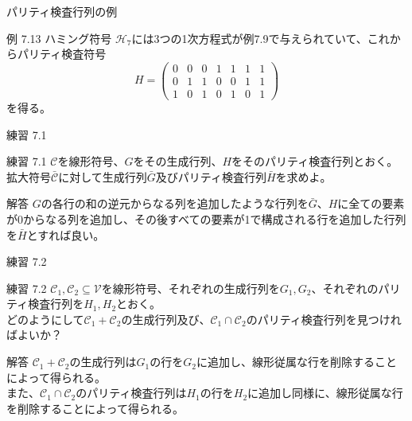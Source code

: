 \documentclass[dvipdfmx,10pt,jsarticle]{beamer}
\begin{document}
  \begin{frame}{パリティ検査行列の例}
    \begin{block}{例 7.13 ハミング符号}
      $\mathcal{H}_7$には3つの1次方程式が例7.9で与えられていて、これからパリティ検査符号
      \[H= \begin{pmatrix}
          0 & 0 & 0 & 1 & 1 & 1 & 1 \\
          0 & 1 & 1 & 0 & 0 & 1 & 1 \\
          1 & 0 & 1 & 0 & 1 & 0 & 1 
        \end{pmatrix} \]
      を得る。
    \end{block}
  \end{frame}
  \begin{frame}{練習 7.1}
    \begin{block}{練習 7.1}
      $\mathcal{C}$を線形符号、$G$をその生成行列、$H$をそのパリティ検査行列とおく。拡大符号$\bar{\mathcal{C}}$に対して生成行列$\bar G$及びパリティ検査行列$\bar H$を求めよ。
    \end{block}
    \begin{block}{解答}
      $G$の各行の和の逆元からなる列を追加したような行列を$\bar G$、$H$に全ての要素が$0$からなる列を追加し、その後すべての要素が1で構成される行を追加した行列を$\bar H$とすれば良い。
    \end{block}
  \end{frame}
  \begin{frame}{練習 7.2}
    \begin{block}{練習 7.2}
      $\mathcal{C}_1, \mathcal{C}_2 \subseteq \mathcal{V}$を線形符号、それぞれの生成行列を$G_1, G_2$、それぞれのパリティ検査行列を$H_1, H_2$とおく。\\
      どのようにして$\mathcal{C}_1 + \mathcal{C}_2$の生成行列及び、$\mathcal{C}_1 \cap \mathcal{C}_2$のパリティ検査行列を見つければよいか？
    \end{block}
    \begin{block}{解答}
      $\mathcal{C}_1 + \mathcal{C}_2$の生成行列は$G_1$の行を$G_2$に追加し、線形従属な行を削除することによって得られる。\\
      また、$\mathcal{C}_1 \cap \mathcal{C}_2$のパリティ検査行列は$H_1$の行を$H_2$に追加し同様に、線形従属な行を削除することによって得られる。
    \end{block}
  \end{frame}
\end{document}
